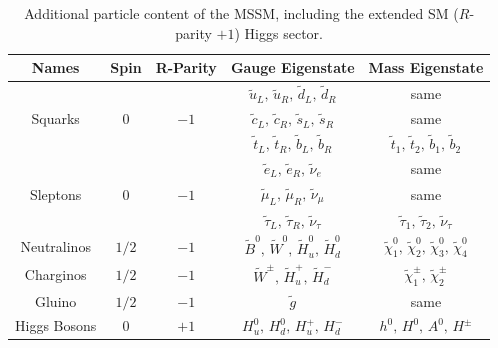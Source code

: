 \begin{table}[!htb]
    \begin{center}
        \caption{
            Additional particle content of the MSSM, including the extended SM ($R$-parity $+1$) Higgs sector.
        }
        \label{tab:mssm_particles}
        \begin{tabular}{c | c | c | c | c}
        \hline
        \hline
            \textbf{Names} & \textbf{Spin} & \textbf{R-Parity} & \textbf{Gauge Eigenstate} & \textbf{Mass Eigenstate} \\
            \hline
            \multirow{3}{*}{Squarks} & \multirow{3}{*}{0} & \multirow{3}{*}{$-1$} & $\tilde{u}_L, \,\tilde{u}_R, \, \tilde{d}_L, \, \tilde{d}_R$ & same  \\
                                                & & & $\tilde{c}_L, \,\tilde{c}_R, \, \tilde{s}_L, \, \tilde{s}_R$ & same  \\
                                                & & & $\tilde{t}_L, \,\tilde{t}_R, \, \tilde{b}_L, \, \tilde{b}_R$ & $\tilde{t}_1,\,\tilde{t}_2,\,\tilde{b}_1,\,\tilde{b}_2$  \\
            \hline
            \multirow{3}{*}{Sleptons} & \multirow{3}{*}{0} & \multirow{3}{*}{$-1$} & $\tilde{e}_L,\,\tilde{e}_R,\,\tilde{\nu}_e$ & same \\
                & & & $\tilde{\mu}_L,\,\tilde{\mu}_R,\,\tilde{\nu}_{\mu}$ & same \\
                & & & $\tilde{\tau}_L,\,\tilde{\tau}_R,\,\tilde{\nu}_{\tau}$ & $\tilde{\tau}_1,\,\tilde{\tau}_2,\,\tilde{\nu}_{\tau}$ \\
            \hline
            Neutralinos & $1/2$ & $-1$ & $\tilde{B}^0,\,\tilde{W}^0,\,\tilde{H}^0_u,\,\tilde{H}^0_d$ & $\tilde{\chi}^0_1,\,\tilde{\chi}^0_2,\,\tilde{\chi}^0_3,\,\tilde{\chi}^0_4$ \\
            \hline
            Charginos & $1/2$ & $-1$ & $\tilde{W}^{\pm},\,\tilde{H}^+_u,\,\tilde{H}^-_d$ & $\tilde{\chi}^{\pm}_1,\,\tilde{\chi}^{\pm}_2$ \\
            \hline
            Gluino & $1/2$ & $-1$ & $\tilde{g}$ & same \\
            \hline
            \hline
            Higgs Bosons & 0 & $+1$ & $H_u^0,\,H_d^0,\,H_u^+,\,H_d^-$ & $h^0,\,H^0,\,A^0,\,H^{\pm}$  \\
        \hline
        \hline
        \end{tabular}
    \end{center}
\end{table}

